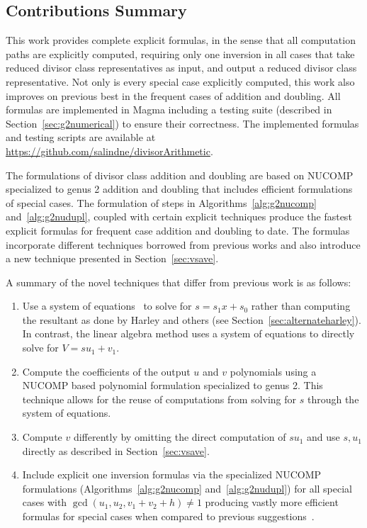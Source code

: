\subsection{Contributions Summary}
\label{sec:g2explRAMOurContr}
This work provides complete explicit formulas, in the sense that all computation
paths are explicitly computed, requiring only one inversion in all cases that
take reduced divisor class representatives as input, and output a reduced
divisor class representative. Not only is every special case explicitly
computed, this work also improves on previous best in the frequent cases of
addition and doubling. 
All formulas are implemented in Magma including a
testing suite (described in Section~\ref{sec:g2numerical}) to ensure their
correctness. The implemented formulas and testing scripts are available at
\url{https://github.com/salindne/divisorArithmetic}.

The formulations of divisor class addition and doubling are based on NUCOMP
specialized to genus 2 addition and doubling that includes efficient
formulations of special cases. The formulation of steps in
Algorithms~\ref{alg:g2nucomp} and~\ref{alg:g2nudupl}, coupled with certain
explicit techniques produce the fastest explicit formulas for frequent case
addition and doubling to date. The formulas incorporate different techniques
borrowed from previous works and also introduce a new technique presented in
Section~\ref{sec:vsave}. 

A summary of the novel techniques that differ from previous work is as follows:
\begin{enumerate}[label=T\arabic*]
\item \label{tq:1} 
Use a system of equations~\cite{Balamohan_MSc_2009,CostelloLauter_geo_2011} to
solve for $s=s_1x + s_0$ rather than computing the resultant as done by Harley
and others (see Section~\ref{sec:alternateharley}). In contrast, the linear
algebra method uses a system of equations to directly solve for $V = su_1 + v_1$.
\item \label{tq:2} 
Compute the coefficients of the output $u$ and $v$ polynomials using a NUCOMP
based polynomial formulation specialized to genus 2. This technique allows for
the reuse of computations from solving for $s$ through the system of equations.
\item \label{tq:3} 
Compute $v$ differently by omitting the direct computation of $su_1$ and use
$s,u_1$ directly as described in Section~\ref{sec:vsave}.
\item \label{tq:4} Include explicit one inversion formulas via the specialized
NUCOMP formulations (Algorithms~\ref{alg:g2nucomp} and~\ref{alg:g2nudupl})
for all special cases with $\gcd (u_1,u_2,v_1 + v_2 + h) \not = 1$ producing
vastly more efficient formulas for special cases when compared to previous
suggestions~\cite{Lange_explicit_2005}.
\end{enumerate}

